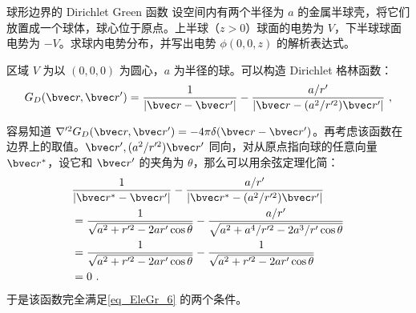 \begin{example}{球形边界的 Dirichlet Green 函数}
设空间内有两个半径为 $a$ 的金属半球壳，将它们放置成一个球体，球心位于原点。上半球（$z>0$）球面的电势为 $V$，下半球球面电势为 $-V$。求球内电势分布，并写出电势 $\phi(0,0,z)$ 的解析表达式。

区域 $V$ 为以 $(0,0,0)$ 为圆心，$a$ 为半径的球。可以构造 Dirichlet 格林函数：
\begin{equation}
G_D(\bvec r,\bvec r')=\frac{1}{|\bvec r-\bvec r'|}-\frac{a/r'}{|\bvec r-(a^2/r'^2)\bvec r'|}~,
\end{equation}

容易知道 $\nabla'^2G_D(\bvec r,\bvec r')=-4\pi\delta(\bvec r-\bvec r')$。再考虑该函数在边界上的取值。$\bvec r',(a^2/r'^2)\bvec r'$ 同向，对从原点指向球的任意向量 $\bvec r^*$，设它和 $\bvec r'$ 的夹角为 $\theta$，那么可以用余弦定理化简：
\begin{equation}
\begin{aligned}
&\frac{1}{|\bvec r^*-\bvec r'|}-\frac{a/r'}{|\bvec r^*-(a^2/r'^2)\bvec r'|}
\\&=\frac{1}{\sqrt{a^2+r'^2-2ar'\cos\theta}}-\frac{a/r'}{\sqrt{a^2+a^4/r'^2-2a^3/r'\cos\theta}}
\\&=\frac{1}{\sqrt{a^2+r'^2-2ar'\cos\theta}}-\frac{1}{\sqrt{a^2+r'^2-2ar'\cos\theta}}
\\&=0~.
\end{aligned}
\end{equation}
于是该函数完全满足\autoref{eq_EleGr_6} 的两个条件。


\end{example}
